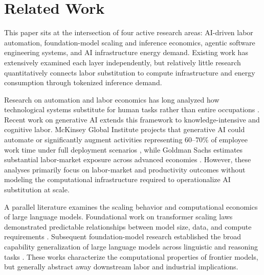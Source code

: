 \documentclass{article}
\begin{document}

\section{Related Work}
\label{sec:related-work}

This paper sits at the intersection of four active research areas: AI-driven labor automation, foundation-model scaling and inference economics, agentic software engineering systems, and AI infrastructure energy demand. Existing work has extensively examined each layer independently, but relatively little research quantitatively connects labor substitution to compute infrastructure and energy consumption through tokenized inference demand.

Research on automation and labor economics has long analyzed how technological systems substitute for human tasks rather than entire occupations \citep{autor2013skills, acemoglu2022tasks}. Recent work on generative AI extends this framework to knowledge-intensive and cognitive labor. McKinsey Global Institute projects that generative AI could automate or significantly augment activities representing 60--70\% of employee work time under full deployment scenarios \citep{mckinsey2023genai}, while Goldman Sachs estimates substantial labor-market exposure across advanced economies \citep{goldmansachs2023ai}. However, these analyses primarily focus on labor-market and productivity outcomes without modeling the computational infrastructure required to operationalize AI substitution at scale.

A parallel literature examines the scaling behavior and computational economics of large language models. Foundational work on transformer scaling laws demonstrated predictable relationships between model size, data, and compute requirements \citep{kaplan2020scaling, hoffmann2022chinchilla}. Subsequent foundation-model research established the broad capability generalization of large language models across linguistic and reasoning tasks \citep{brown2020gpt3, bommasani2021foundation}. These works characterize the computational properties of frontier models, but generally abstract away downstream labor and industrial implications.
\end{document}
